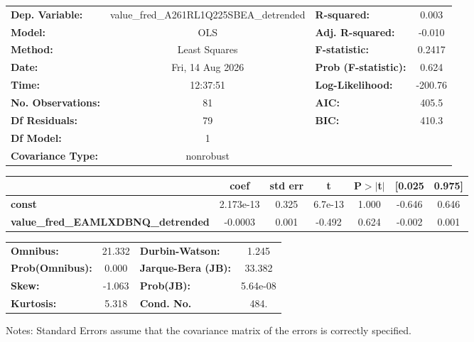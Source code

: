 \begin{center}
\begin{tabular}{lclc}
\toprule
\textbf{Dep. Variable:}                    & value\_fred\_A261RL1Q225SBEA\_detrended & \textbf{  R-squared:         } &     0.003   \\
\textbf{Model:}                            &                   OLS                   & \textbf{  Adj. R-squared:    } &    -0.010   \\
\textbf{Method:}                           &              Least Squares              & \textbf{  F-statistic:       } &    0.2417   \\
\textbf{Date:}                             &             Fri, 14 Aug 2026            & \textbf{  Prob (F-statistic):} &    0.624    \\
\textbf{Time:}                             &                 12:37:51                & \textbf{  Log-Likelihood:    } &   -200.76   \\
\textbf{No. Observations:}                 &                      81                 & \textbf{  AIC:               } &     405.5   \\
\textbf{Df Residuals:}                     &                      79                 & \textbf{  BIC:               } &     410.3   \\
\textbf{Df Model:}                         &                       1                 & \textbf{                     } &             \\
\textbf{Covariance Type:}                  &                nonrobust                & \textbf{                     } &             \\
\bottomrule
\end{tabular}
\begin{tabular}{lcccccc}
                                           & \textbf{coef} & \textbf{std err} & \textbf{t} & \textbf{P$> |$t$|$} & \textbf{[0.025} & \textbf{0.975]}  \\
\midrule
\textbf{const}                             &    2.173e-13  &        0.325     &   6.7e-13  &         1.000        &       -0.646    &        0.646     \\
\textbf{value\_fred\_EAMLXDBNQ\_detrended} &      -0.0003  &        0.001     &    -0.492  &         0.624        &       -0.002    &        0.001     \\
\bottomrule
\end{tabular}
\begin{tabular}{lclc}
\textbf{Omnibus:}       & 21.332 & \textbf{  Durbin-Watson:     } &    1.245  \\
\textbf{Prob(Omnibus):} &  0.000 & \textbf{  Jarque-Bera (JB):  } &   33.382  \\
\textbf{Skew:}          & -1.063 & \textbf{  Prob(JB):          } & 5.64e-08  \\
\textbf{Kurtosis:}      &  5.318 & \textbf{  Cond. No.          } &     484.  \\
\bottomrule
\end{tabular}
\end{center}

Notes: \newline
 [1] Standard Errors assume that the covariance matrix of the errors is correctly specified.